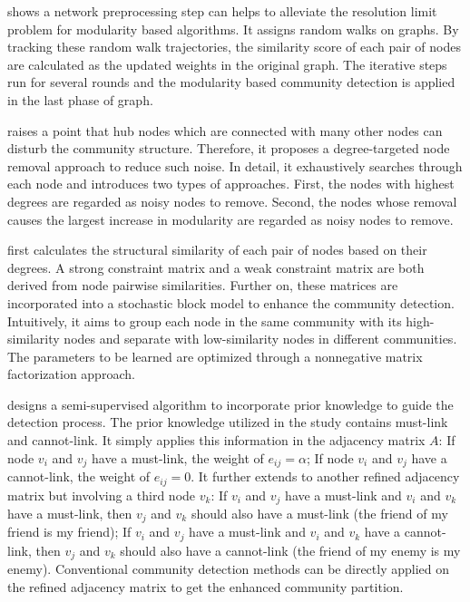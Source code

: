 \cite{lai2010enhanced} shows a network preprocessing step can helps to alleviate the resolution limit problem for modularity based algorithms. It assigns random walks on graphs. By tracking these random walk trajectories, the similarity score of each pair of nodes are calculated as the updated weights in the original graph. The iterative steps run for several rounds and the modularity based community detection is applied in the last phase of graph.

\cite{wen2011improving} raises a point that hub nodes which are connected with many other nodes can disturb the community structure. Therefore, it proposes a degree-targeted node removal approach to reduce such noise. In detail,  it exhaustively searches through each node and introduces two types of approaches. First, the nodes with highest degrees are regarded as noisy nodes to remove. Second, the nodes whose removal causes the largest increase in modularity are regarded as noisy nodes to remove. 

\cite{he2016model} first calculates the structural similarity of each pair of nodes based on their degrees. A strong constraint matrix and a weak constraint matrix are both derived from node pairwise similarities. Further on, these matrices are incorporated into a stochastic block model to enhance the community detection. Intuitively, it aims to group each node in the same community with its high-similarity nodes and separate with low-similarity nodes in different communities. The parameters to be learned are optimized through a nonnegative matrix factorization approach. 

\cite{zhang2013enhanced} designs a semi-supervised algorithm to incorporate prior knowledge to guide the detection process. The prior knowledge utilized in the study contains must-link and cannot-link. It simply applies this information in the adjacency matrix $A$: If node $v_i$ and $v_j$ have a must-link, the weight of $e_{ij} = \alpha$; If node $v_i$ and $v_j$ have a cannot-link, the weight of $e_{ij} = 0$. It further extends to another refined adjacency matrix but involving a third node $v_k$: If $v_i$ and $v_j$ have a must-link and $v_i$ and $v_k$ have a must-link, then $v_j$ and $v_k$ should also have a must-link (the friend of my friend is my friend); If $v_i$ and $v_j$ have a must-link and $v_i$ and $v_k$ have a cannot-link, then $v_j$ and $v_k$ should also have a cannot-link (the friend of my enemy is my enemy). Conventional community detection methods can be directly applied on the refined adjacency matrix to get the enhanced community partition.

